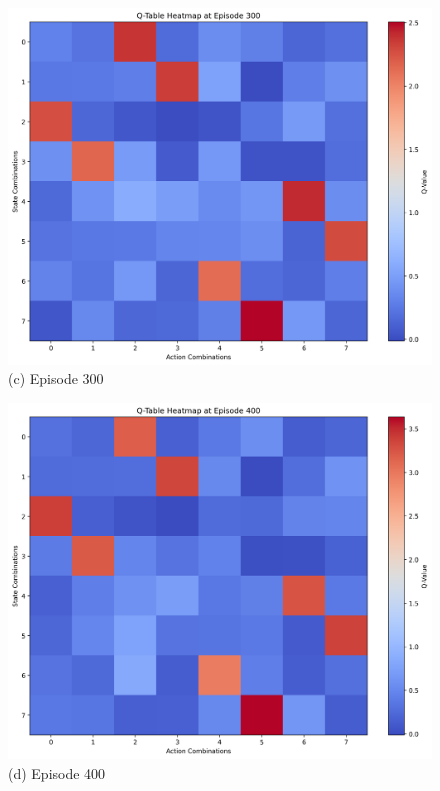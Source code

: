 \begin{figure}[htbp]
    \vspace{0.5em}
    \begin{minipage}{0.45\textwidth}
        \includegraphics[width=\linewidth]{figure/multi_switch/q_heatmap_episode_300.png}
        \centering (c) Episode 300
    \end{minipage}
    \hfill
    \begin{minipage}{0.45\textwidth}
        \includegraphics[width=\linewidth]{figure/multi_switch/q_heatmap_episode_400.png}
        \centering (d) Episode 400
    \end{minipage}


\end{figure}
